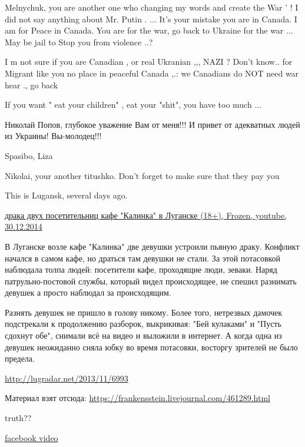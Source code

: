 \begin{itemize}
\begin{itemize}
Melnychuk, you are another one who changing my words and create the War ' ! I did not say anything about Mr. Putin . ... It's your mistake you are in Canada. I am for Peace in Canada. You are for the war, go back to Ukraine for the war ... May be jail to Stop you from violence ..?

I m not sure if you are Canadian , or real Ukranian ,,,
NAZI ? Don't know.. for Migrant like you no place in peaceful Canada ,.: we Canadians do NOT need war hear ., go back

If you want " eat your children" , eat your "shit", you have too much ...

Николай Попов, глубокое уважение Вам от меня!!! И привет от адекватных людей из Украины! Вы-молодец!!!

Spasibo, Liza

Nikolai, your another titushko. Don't forget to make sure that they pay you

This is Lugansk, several days ago.

\href{http://youtu.be/I0EX_uVUf1U}{%
драка двух посетительниц кафе "Калинка" в Луганске (18+), Frozen, youtube, 30.12.2014%
}

В Луганске возле кафе "Калинка" две девушки устроили пьяную драку. Конфликт
начался в самом кафе, но драться там девушки не стали.  За этой потасовкой
наблюдала толпа людей: посетители кафе, проходящие люди, зеваки. Наряд
патрульно-постовой службы, который видел происходящее,  не спешил разнимать
девушек а просто наблюдал за происходящим.

Разнять девушек не пришло в голову никому. Более того, нетрезвых дамочек
подстрекали к продолжению разборок, выкрикивая: "Бей кулаками" и "Пусть сдохнут
обе", снимали всё на видео и выложили в интернет. А когда одна из девушек
неожиданно сняла юбку во время потасовки, восторгу зрителей не было предела.

\url{http://lugradar.net/2013/11/6993}

Материал взят отсюда: \url{https://frankensstein.livejournal.com/461289.html}

truth?? 

\href{https://www.facebook.com/video.php?v=754199491361130}{facebook video}


\end{itemize} %



\end{itemize}
